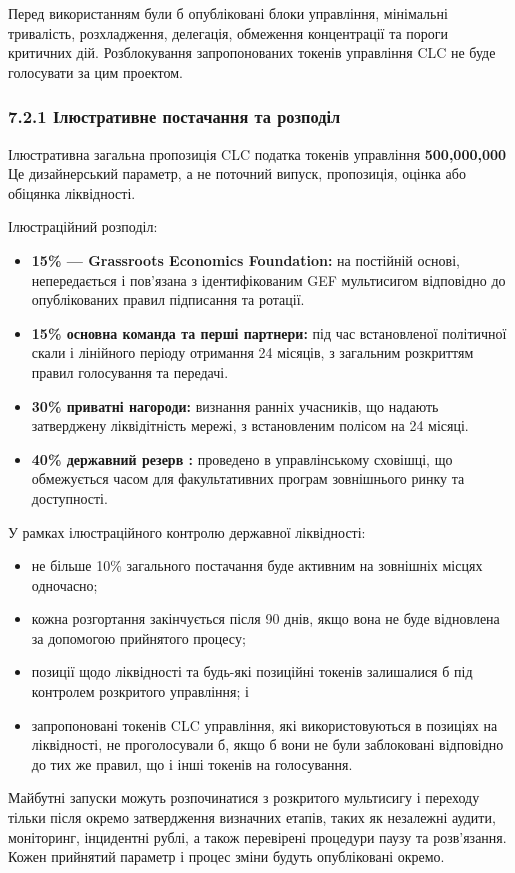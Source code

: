 \documentclass[11pt]{article}
\begin{document}
Перед використанням були б опубліковані блоки управління, мінімальні тривалість, розхладження, делегація, обмеження концентрації та пороги критичних дій. Розблокування запропонованих токенів управління CLC не буде голосувати за цим проектом.

\subsubsection*{7.2.1 Ілюстративне постачання та розподіл}

Ілюстративна загальна пропозиція CLC податка токенів управління \textbf{500,000,000} Це дизайнерський параметр, а не поточний випуск, пропозиція, оцінка або обіцянка ліквідності.

Ілюстраційний розподіл:

\begin{itemize}[leftmargin=*]
\item \textbf{15\% --- Grassroots Economics Foundation:} на постійній основі, непередається і пов'язана з ідентифікованим GEF мультисигом відповідно до опублікованих правил підписання та ротації.
\item \textbf{15\%  основна команда та перші партнери:} під час встановленої політичної скали і лінійного періоду отримання 24 місяців, з загальним розкриттям правил голосування та передачі.
\item \textbf{30\%  приватні нагороди:} визнання ранніх учасників, що надають затверджену ліквідітність мережі, з встановленим полісом на 24 місяці.
\item \textbf{40\%  державний резерв :} проведено в управлінському сховішці, що обмежується часом для факультативних програм зовнішнього ринку та доступності.
\end{itemize}
У рамках ілюстраційного контролю державної ліквідності:

\begin{itemize}[leftmargin=*]
\item не більше 10\% загального постачання буде активним на зовнішніх місцях одночасно;
\item кожна розгортання закінчується після 90 днів, якщо вона не буде відновлена за допомогою прийнятого процесу;
\item позиції щодо ліквідності та будь-які позиційні токенів залишалися б під контролем розкритого управління; і
\item запропоновані токенів CLC управління, які використовуються в позиціях на ліквідності, не проголосували б, якщо б вони не були заблоковані відповідно до тих же правил, що і інші токенів на голосування.
\end{itemize}
Майбутні запуски можуть розпочинатися з розкритого мультисигу і переходу тільки після окремо затвердження визначних етапів, таких як незалежні аудити, моніторинг, інцидентні рублі, а також перевірені процедури паузу та розв'язання. Кожен прийнятий параметр і процес зміни будуть опубліковані окремо.
\end{document}
